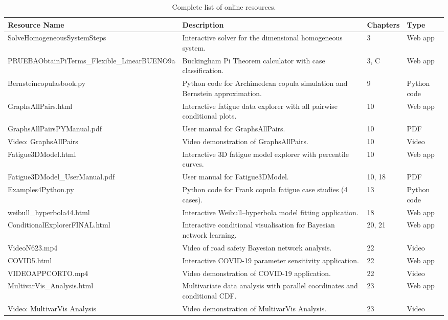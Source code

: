 \begin{table}[H]
\centering
\caption{Complete list of online resources.}
\begin{tabular}{p{3.5cm}p{5.5cm}p{2.5cm}p{2.5cm}}
\toprule
\textbf{Resource Name} & \textbf{Description} & \textbf{Chapters} & \textbf{Type} \\
\midrule
SolveHomogeneousSystemSteps & Interactive solver for the dimensional homogeneous system. & 3 & Web app \\
PRUEBAObtainPiTerms\_Flexible\_LinearBUENO9a & Buckingham Pi Theorem calculator with case classification. & 3, C & Web app \\
Bernsteincopulasbook.py & Python code for Archimedean copula simulation and Bernstein approximation. & 9 & Python code \\
GraphsAllPairs.html & Interactive fatigue data explorer with all pairwise conditional plots. & 10 & Web app \\
GraphsAllPairsPYManual.pdf & User manual for GraphsAllPairs. & 10 & PDF \\
Video: GraphsAllPairs & Video demonstration of GraphsAllPairs. & 10 & Video \\
Fatigue3DModel.html & Interactive 3D fatigue model explorer with percentile curves. & 10 & Web app \\
Fatigue3DModel\_UserManual.pdf & User manual for Fatigue3DModel. & 10, 18 & PDF \\
Examples4Python.py & Python code for Frank copula fatigue case studies (4 cases). & 13 & Python code \\
weibull\_hyperbola44.html & Interactive Weibull–hyperbola model fitting application. & 18 & Web app \\
ConditionalExplorerFINAL.html & Interactive conditional visualisation for Bayesian network learning. & 20, 21 & Web app \\
VideoN623.mp4 & Video of road safety Bayesian network analysis. & 22 & Video \\
COVID5.html & Interactive COVID-19 parameter sensitivity application. & 22 & Web app \\
VIDEOAPPCORTO.mp4 & Video demonstration of COVID-19 application. & 22 & Video \\
MultivarVis\_Analysis.html & Multivariate data analysis with parallel coordinates and conditional CDF. & 23 & Web app \\
Video: MultivarVis Analysis & Video demonstration of MultivarVis Analysis. & 23 & Video \\
\bottomrule
\end{tabular}
\end{table}

